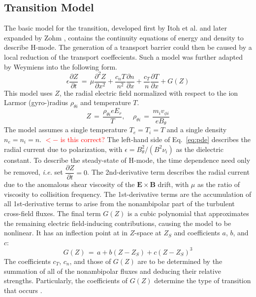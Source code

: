 \documentclass[a4paper]{article}
\newcommand\mynotes[1]{\textcolor{red}{#1}}
\begin{document}
\subsection{Transition Model}
The basic model for the transition, developed first by Itoh et al. \cite{itoh_edge_1991} and later expanded by Zohm \cite{zohm_dynamic_1994}, contains the continuity equations of energy and density to describe H-mode.
The generation of a transport barrier could then be caused by a local reduction of the transport coeffecients.
Such a model was further adapted by Weymiens \cite{weymiens_bifurcation_2014} into the following form.
\begin{equation}
	\epsilon \frac{\partial Z}{\partial t} \,=\, \mu \frac{\partial^2 Z}{\partial x^2} + \frac{c_n T}{n^2} \frac{\partial n}{\partial x} + \frac{c_T}{n} \frac{\partial T}{\partial x} + G(Z)
	\label{eq:pde}
\end{equation}
This model uses $Z$, the radial electric field normalized with respect to the ion Larmor (gyro-)radius $\rho_{\theta i}$ and temperature $T$.
\begin{equation}
	Z \,=\, \frac{\rho_{\theta i} e E_r}{T}, ~~~~~ \rho_{\theta i} \,=\, \frac{m_i v_{\phi i}}{e B_\theta}
	\label{eq:normalization}
\end{equation}
The model assumes a single temperature $T_e = T_i = T$ and a single density $n_e = n_i = n$. \mynotes{$<-$ is this correct?}
The left-hand side of Eq.~\ref{eq:pde} describes the radial current due to polarization, with $\epsilon = B_\theta^2 / (B^2 \nu_i)$ as the dielectric constant.
To describe the steady-state of H-mode, the time dependence need only be removed, \emph{i.e.} set $\dfrac{\partial Z}{\partial t} = 0$.
The 2nd-derivative term describes the radial current due to the anomalous shear viscosity of the $\mathbf{E}\times\mathbf{B}$ drift, with $\mu$ as the ratio of viscosity to collisition frequency.
The 1st-derivative terms are the accumulation of all 1st-derivative terms to arise from the nonambipolar part of the turbulent cross-field fluxes.
The final term $G(Z)$ is a cubic polynomial that approximates the remaining electric field-inducing contributions, causing the model to be nonlinear.
It has an inflection point at in $Z$-space at $Z_S$ and coefficients $a$, $b$, and $c$:
\begin{equation}
	G(Z) \,=\, a + b(Z - Z_S) + c(Z - Z_S)^3
\end{equation}
The coefficients $c_T$, $c_n$, and those of $G(Z)$ are to be determined by the summation of all of the nonambipolar fluxes and deducing their relative strengths.
Particularly, the coefficients of $G(Z)$ determine the type of transition that occurs \cite{staps_backstepping_2017}.
\end{document}
